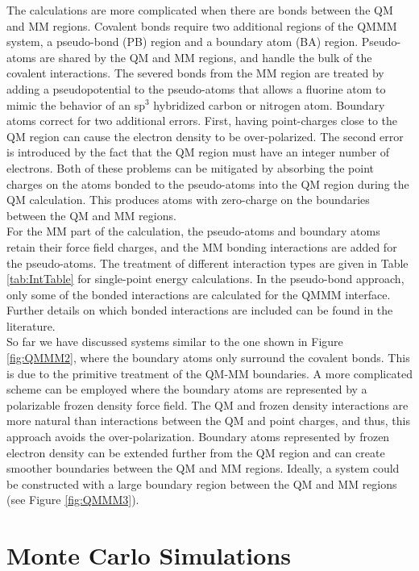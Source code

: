 \documentclass[12pt]{report}
\begin{document}
The calculations are more complicated when there are bonds between the QM and
MM regions. Covalent bonds require two additional regions of the QMMM system,
a pseudo-bond (PB) region and a boundary atom (BA) region. Pseudo-atoms are
shared by the QM and MM regions, and handle the bulk of the covalent
interactions. The severed bonds from the MM region are treated by adding a
pseudopotential to the pseudo-atoms that allows a fluorine atom to mimic the
behavior of an sp$^3$ hybridized carbon or nitrogen atom. Boundary atoms
correct for two additional errors. First, having point-charges close to the
QM region can cause the electron density to be over-polarized. The second
error is introduced by the fact that the QM region must have an integer number
of electrons. Both of these problems can be mitigated by absorbing the point
charges on the atoms bonded to the pseudo-atoms into the QM region during the
QM calculation. This produces atoms with zero-charge on the boundaries between
the QM and MM regions. \\

For the MM part of the calculation, the pseudo-atoms and boundary atoms retain
their force field charges, and the MM bonding interactions are added for the
pseudo-atoms. The treatment of different interaction types are given in Table
\ref{tab:IntTable} for single-point energy calculations. In the pseudo-bond
approach, only some of the bonded interactions are calculated for the QMMM
interface. Further details on which bonded interactions are included can be
found in the literature. \\

So far we have discussed systems similar to the one shown in Figure
\ref{fig:QMMM2}, where the boundary atoms only surround the covalent bonds.
This is due to the primitive treatment of the QM-MM boundaries. A more
complicated scheme can be employed where the boundary atoms are represented by
a polarizable frozen density force field. The QM and frozen density
interactions are more natural than interactions between the QM and point
charges, and thus, this approach avoids the over-polarization. Boundary atoms
represented by frozen electron density can be extended further from the QM
region and can create smoother boundaries between the QM and MM regions.
Ideally, a system could be constructed with a large boundary region between
the QM and MM regions (see Figure \ref{fig:QMMM3}).

\section{Monte Carlo Simulations}
\end{document}
